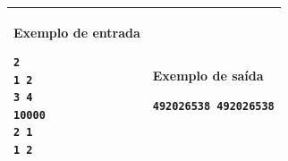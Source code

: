 \begin{table}[!h]
\centering
\begin{tabular}{|l|l|}
\hline
\begin{minipage}[t]{3in}
\textbf{Exemplo de entrada}
\begin{verbatim}
2
1 2
3 4
10000
2 1
1 2
\end{verbatim}
\vspace{1mm}
\end{minipage}
&
\begin{minipage}[t]{3in}
\textbf{Exemplo de saída}
\begin{verbatim}
492026538 492026538
\end{verbatim}
\vspace{1mm}
\end{minipage} \\
\hline
\end{tabular}
\end{table}
